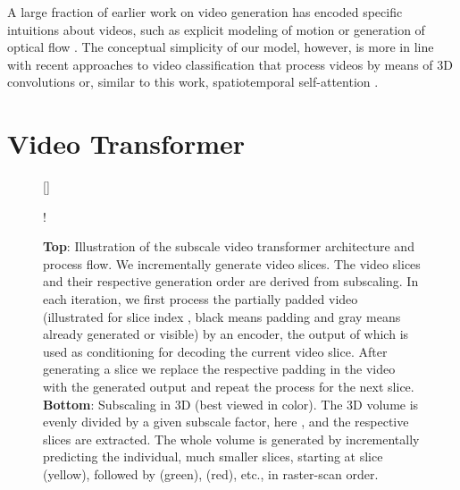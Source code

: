 \documentclass{article} \usepackage{iclr2020_conference,times}
\begin{document}
A large fraction of earlier work on video generation has encoded specific intuitions about videos, such as explicit modeling of motion \citep{Finn2016VideoPrediction,Denton2018SVGLP} or generation of optical flow \citep{Handa2016SpatioTemporalAE}.
The conceptual simplicity of our model, however, is more in line with recent approaches to video classification that process videos by means of 3D convolutions \citep{Carreira2017QuoVA,Xie2018RethinkingSF} or, similar to this work, spatiotemporal self-attention \citep{Girdhar2018VideoActionTransformer}.

\section{Video Transformer}

\begin{figure}[t]
    [\FBwidth]
    {\caption{\small \textbf{Top}: Illustration of the subscale video transformer architecture and process flow. We incrementally generate  video slices. The video slices and their respective generation order are derived from subscaling. In each iteration, we first process the partially padded video (illustrated for slice index , black means padding and gray means already generated or visible) by an encoder, the output of which is used as conditioning for decoding the current video slice. After generating a slice we replace the respective padding in the video with the generated output and repeat the process for the next slice.
    \textbf{Bottom}: Subscaling in 3D (best viewed in color). The 3D volume is evenly divided by a given subscale factor, here , and the respective slices are extracted. The whole volume is generated by incrementally predicting the individual, much smaller slices, starting at slice  (yellow), followed by  (green),  (red), etc., in raster-scan order.} \label{fig:architecture_subscaling}}
{\resizebox {0.6\textwidth} {!} {}}
\end{figure}
\end{document}
